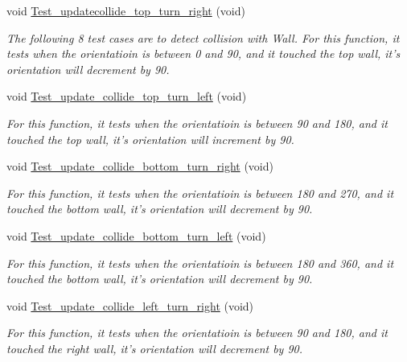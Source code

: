 \begin{DoxyCompactItemize}
void \hyperlink{classEnvironmentClassTest_a202238e6bec3a80f625519c9d1658c59}{Test\-\_\-updatecollide\-\_\-top\-\_\-turn\-\_\-right} (void)
\begin{DoxyCompactList}\small\item\em The following 8 test cases are to detect collision with Wall. For this function, it tests when the orientatioin is between 0 and 90, and it touched the top wall, it's orientation will decrement by 90. \end{DoxyCompactList}\item 
void \hyperlink{classEnvironmentClassTest_a0e29ad516c2ac19f2388dd1e9989dd90}{Test\-\_\-update\-\_\-collide\-\_\-top\-\_\-turn\-\_\-left} (void)
\begin{DoxyCompactList}\small\item\em For this function, it tests when the orientatioin is between 90 and 180, and it touched the top wall, it's orientation will increment by 90. \end{DoxyCompactList}\item 
void \hyperlink{classEnvironmentClassTest_ad739326d2fd1e2d91ebbaa4f05d3a5d0}{Test\-\_\-update\-\_\-collide\-\_\-bottom\-\_\-turn\-\_\-right} (void)
\begin{DoxyCompactList}\small\item\em For this function, it tests when the orientatioin is between 180 and 270, and it touched the bottom wall, it's orientation will decrement by 90. \end{DoxyCompactList}\item 
void \hyperlink{classEnvironmentClassTest_a18a7de3e61196c4cee5c3d0c4678aee5}{Test\-\_\-update\-\_\-collide\-\_\-bottom\-\_\-turn\-\_\-left} (void)
\begin{DoxyCompactList}\small\item\em For this function, it tests when the orientatioin is between 180 and 360, and it touched the bottom wall, it's orientation will decrement by 90. \end{DoxyCompactList}\item 
void \hyperlink{classEnvironmentClassTest_a8115b7b021e30fd0e449e2a69d7a30ee}{Test\-\_\-update\-\_\-collide\-\_\-left\-\_\-turn\-\_\-right} (void)
\begin{DoxyCompactList}\small\item\em For this function, it tests when the orientatioin is between 90 and 180, and it touched the right wall, it's orientation will decrement by 90. \end{DoxyCompactList}\item 

\end{DoxyCompactItemize}
